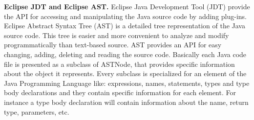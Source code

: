 \textbf{Eclipse JDT and Eclipse AST.} Eclipse Java Development Tool (JDT) \cite{jdt} provide the API for accessing and manipulating the Java source code by adding plug-ins. Eclipse Abstract Syntax Tree (AST) \cite{ast} is a detailed tree representation of the Java source code. This tree is easier and more convenient to analyze and modify programmatically than text-based source. AST provides an API for easy changing, adding, deleting and reading the source code. Basically each Java code file is presented as a subclass of ASTNode, that provides specific information about the object it represents. Every subclass is specialized for an element of the Java Programming Language like: expressions, names, statements, types and type body declarations and they contain specific information for each element. For instance a type body declaration will contain information about the name, return type, parameters, etc.

